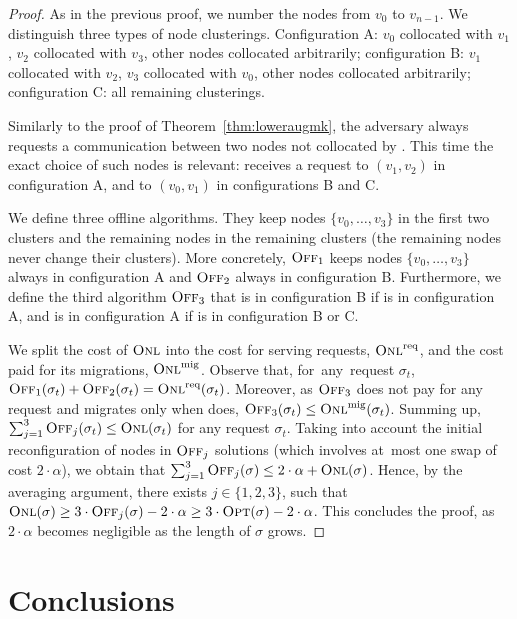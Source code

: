 \begin{proof} As in the previous proof, we number the nodes from $v_0$ to
$v_{n-1}$. We distinguish three types of node clusterings. Configuration A:
$v_0$ collocated with $v_1$, $v_2$ collocated with $v_3$, other nodes
collocated arbitrarily; configuration B: $v_1$ collocated with $v_2$, $v_3$
collocated with $v_0$, other nodes collocated arbitrarily; configuration C:
all remaining clusterings.

Similarly to the proof of Theorem~\ref{thm:loweraugmk}, the adversary always
requests a communication between two nodes not collocated by \ONL.
This time the exact choice of such nodes is relevant: \ONL receives a request to
$(v_1,v_2)$ in configuration A, and to $(v_0,v_1)$ in configurations B and C.

We define three offline algorithms. They keep nodes
$\{v_0,\ldots,v_3\}$ in the first two clusters and the remaining nodes in the
remaining clusters (the remaining nodes never change their clusters). 
More concretely, $\textsc{Off}_1$ keeps nodes $\{v_0,\ldots,v_3\}$ always in
configuration A and $\textsc{Off}_2$ always in configuration B. Furthermore, we define
the third algorithm $\textsc{Off}_3$ that is in configuration B if \ONL is in
configuration A, and is in configuration A if \ONL is in configuration B or C.

We split the cost of $\textsc{Onl}$ into the cost for serving requests, $\textsc{Onl}^\textnormal{req}$, and
the cost paid for its migrations, $\textsc{Onl}^\textnormal{mig}$. Observe that, for~any~request
$\sigma_t$, $\textsc{Off}_1(\sigma_t) + \textsc{Off}_2(\sigma_t) = \textsc{Onl}^\textnormal{req}(\sigma_t)$.
Moreover, as $\textsc{Off}_3$ does not pay for any request and migrates only when 
\ONL does, $\textsc{Off}_3(\sigma_t) \leq \textsc{Onl}^\textnormal{mig}(\sigma_t)$. Summing up,
$\sum_{j=1}^3 \textsc{Off}_j(\sigma_t) \leq \textsc{Onl}(\sigma_t)$ for any request $\sigma_t$.
Taking into account the initial reconfiguration of nodes in $\textsc{Off}_j$ solutions
(which involves at~most one swap of cost $2 \cdot \alpha$), we obtain that
$\sum_{j=1}^3 \textsc{Off}_j(\sigma) \leq 2 \cdot \alpha + \textsc{Onl}(\sigma)$. Hence, by the
averaging argument, there exists $j \in \{1,2,3\}$, such that $\textsc{Onl}(\sigma)
\geq 3 \cdot \textsc{Off}_j(\sigma) - 2 \cdot \alpha \geq 3 \cdot \textsc{Opt}(\sigma) - 
2 \cdot \alpha$. This concludes the proof, as $2 \cdot \alpha$ becomes
negligible as the length of $\sigma$ grows.
\end{proof}



\section{Conclusions}\label{sec:conclusion-dynamic}

